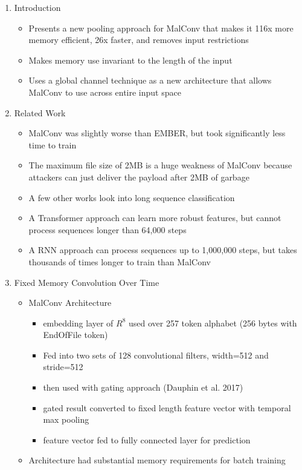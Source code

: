 \documentclass{article}
\begin{document}
\begin{enumerate}
	\item Introduction
	\begin{itemize}
		\item Presents a new pooling approach for MalConv that makes it 116x more memory efficient, 26x faster, and removes input restrictions
		\item Makes memory use invariant to the length of the input
		\item Uses a global channel technique as a new architecture that allows MalConv to use across entire input space
	\end{itemize}
	\item Related Work
	\begin{itemize}
		\item MalConv was slightly worse than EMBER, but took significantly less time to train
		\item The maximum file size of 2MB is a huge weakness of MalConv because attackers can just deliver the payload after 2MB of garbage
		\item A few other works look into long sequence classification
		\item A Transformer approach can learn more robust features, but cannot process sequences longer than 64,000 steps
		\item A RNN approach can process sequences up to 1,000,000 steps, but takes thousands of times longer to train than MalConv
	\end{itemize}
	\item Fixed Memory Convolution Over Time
	\begin{itemize}
		\item MalConv Architecture
		\begin{itemize}
			\item embedding layer of $R^8$ used over 257 token alphabet (256 bytes with EndOfFile token)
			\item Fed into two sets of 128 convolutional filters, width=512 and stride=512
			\item then used with gating approach (Dauphin et al. 2017)
			\item gated result converted to fixed length feature vector with temporal max pooling
			\item feature vector fed to fully connected layer for prediction
		\end{itemize}
		\item Architecture had substantial memory requirements for batch training

\end{itemize}
\end{enumerate}
\end{document}
